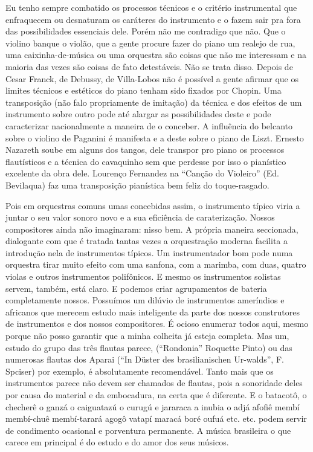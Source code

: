 Eu tenho sempre combatido os processos técnicos e o critério
instrumental que enfraquecem ou desnaturam os caráteres do instrumento e
o fazem sair pra fora das possibilidades essenciais dele. Porém não me
contradigo que não. Que o violino banque o violão, que a gente procure
fazer do piano um realejo de rua, uma caixinha-de-música ou uma
orquestra são coisas que não me interessam e na maioria das vezes são
coisas de fato detestáveis. Não se trata disso. Depois de Cesar Franck,
de Debussy, de Villa-Lobos não é possível a gente afirmar que os limites
técnicos e estéticos do piano tenham sido fixados por Chopin. Uma
transposição (não falo propriamente de imitação) da técnica e dos
efeitos de um instrumento sobre outro pode até alargar as possibilidades
deste e pode caracterizar nacionalmente a maneira de o conceber. A
influência do belcanto sobre o violino de Paganini é manifesta e a deste
sobre o piano de Liszt. Ernesto Nazareth soube em alguns dos tangos,
dele transpor pro piano os processos flautísticos e a técnica do
cavaquinho sem que perdesse por isso o pianístico excelente da obra
dele. Lourenço Fernandez na ``Canção do Violeiro'' (Ed. Bevilaqua) faz uma
transposição pianística bem feliz do toque-rasgado.

Pois em orquestras comuns umas concebidas assim, o instrumento típico
viria a juntar o seu valor sonoro novo e a sua eficiência de
caraterização. Nossos compositores ainda não imaginaram: nisso bem. A
própria maneira seccionada, dialogante com que é tratada tantas vezes a
orquestração moderna facilita a introdução nela de instrumentos típicos.
Um instrumentador bom pode numa orquestra tirar muito efeito com uma
sanfona, com a marimba, com duas, quatro violas e outros instrumentos
polifônicos. E mesmo os instrumentos solistas servem, também, está
claro. E podemos criar agrupamentos de bateria completamente nossos.
Possuímos um dilúvio de instrumentos ameríndios e africanos que merecem
estudo mais inteligente da parte dos nossos construtores de instrumentos
e dos nossos compositores. É ocioso enumerar todos aqui, mesmo porque
não posso garantir que a minha colheita já esteja completa. Mas um,
estudo do grupo das três flautas parece, (``Rondonia'' Roquette Pinto) ou
das numerosas flautas dos Aparai (``In Düster des brasilianischen
Ur-walds'', F. Spciser) por exemplo, é absolutamente recomendável. Tanto
mais que os instrumentos parece não devem ser chamados de flautas, pois
a sonoridade deles por causa do material e da embocadura, na certa que é
diferente. E o batacotô, o checherê o ganzá o caiguatazú o curugú e
jararaca a inubia o adjá afofiê membí membí-chuê membí-tarará agogô
vatapí maracá boré oufuá etc. etc. podem servir de condimento ocasional
e porventura permanente. A música brasileira o que carece em principal é
do estudo e do amor dos seus músicos.

